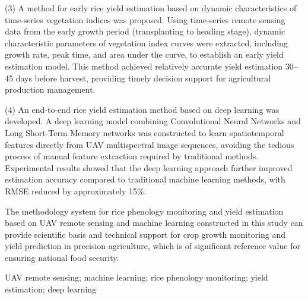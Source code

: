 {(3) A method for early rice yield estimation based on dynamic characteristics of time-series vegetation indices was proposed. Using time-series remote sensing data from the early growth period (transplanting to heading stage), dynamic characteristic parameters of vegetation index curves were extracted, including growth rate, peak time, and area under the curve, to establish an early yield estimation model. This method achieved relatively accurate yield estimation 30--45 days before harvest, providing timely decision support for agricultural production management.

(4) An end-to-end rice yield estimation method based on deep learning was developed. A deep learning model combining Convolutional Neural Networks and Long Short-Term Memory networks was constructed to learn spatiotemporal features directly from UAV multispectral image sequences, avoiding the tedious process of manual feature extraction required by traditional methods. Experimental results showed that the deep learning approach further improved estimation accuracy compared to traditional machine learning methods, with RMSE reduced by approximately 15\%.

The methodology system for rice phenology monitoring and yield estimation based on UAV remote sensing and machine learning constructed in this study can provide scientific basis and technical support for crop growth monitoring and yield prediction in precision agriculture, which is of significant reference value for ensuring national food security.

\vspace{0.5cm}

%
{\setlength{\baselineskip}{18pt}%
UAV remote sensing; machine learning; rice phenology monitoring; yield estimation; deep learning}
}

\clearpage
